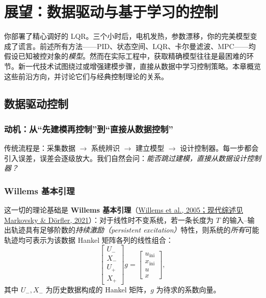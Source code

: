 \section{展望：数据驱动与基于学习的控制}

你部署了精心调好的 LQR。三个小时后，电机发热，参数漂移，你的完美模型变成了谎言。前述所有方法------PID、状态空间、LQR、卡尔曼滤波、MPC------均假设已知被控对象的\emph{模型}。然而在实际工程中，获取精确模型往往是最困难的环节。新一代技术试图绕过或增强建模步骤，直接从数据中学习控制策略。本章概览这些前沿方向，并讨论它们与经典控制理论的关系。

\subsection{数据驱动控制}

\subsubsection{动机：从``先建模再控制''到``直接从数据控制''}

传统流程是：采集数据 $\to$ 系统辨识 $\to$ 建立模型 $\to$ 设计控制器。每一步都会引入误差，误差会逐级放大。我们自然会问：\emph{能否跳过建模，直接从数据设计控制器？}

\subsubsection{Willems 基本引理}

这一切的理论基础是 \textbf{Willems 基本引理}（\href{https://arxiv.org/abs/2206.00397}{Willems et al., 2005；现代综述见 Markovsky \& Dörfler, 2021}）：对于线性时不变系统，若一条长度为 $T$ 的输入--输出轨迹具有足够阶数的\emph{持续激励（persistent excitation）}特性，则系统的\emph{所有}可能轨迹均可表示为该数据 Hankel 矩阵各列的线性组合：
\[
\begin{bmatrix} U_- \\ X_- \\ U_+ \\ X_+ \end{bmatrix} g = \begin{bmatrix} u_{\mathrm{ini}} \\ x_{\mathrm{ini}} \\ u \\ x \end{bmatrix},
\]
其中 $U_-, X_-$ 为历史数据构成的 Hankel 矩阵，$g$ 为待求的系数向量。

